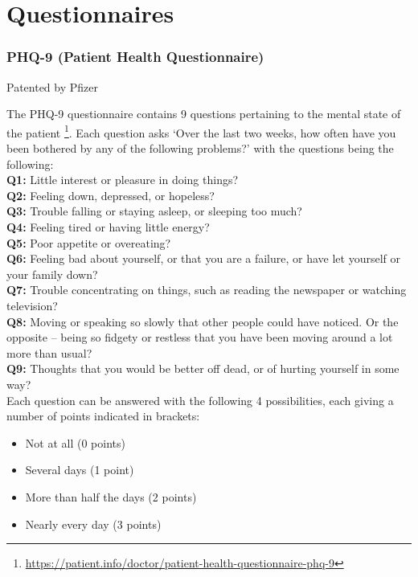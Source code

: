 \chapter{Questionnaires}
\label{appendix:questionnaires}
\subsection{PHQ-9 (Patient Health Questionnaire)}
Patented by Pfizer

The PHQ-9 questionnaire contains 9 questions pertaining to the mental state of the patient \footnote{\url{https://patient.info/doctor/patient-health-questionnaire-phq-9}}. Each question asks ‘Over the last two weeks, how often have you been bothered by any of the following problems?’ with the questions being the following: \\

\textbf{Q1:} Little interest or pleasure in doing things? \\

\textbf{Q2:} Feeling down, depressed, or hopeless? \\

\textbf{Q3:} Trouble falling or staying asleep, or sleeping too much? \\

\textbf{Q4:} Feeling tired or having little energy? \\

\textbf{Q5:} Poor appetite or overeating? \\

\textbf{Q6:} Feeling bad about yourself, or that you are a failure, or have let yourself or your family down? \\

\textbf{Q7:} Trouble concentrating on things, such as reading the newspaper or watching television? \\

\textbf{Q8:} Moving or speaking so slowly that other people could have noticed. Or the opposite – being so fidgety or restless that you have been moving around a lot more than usual? \\

\textbf{Q9:} Thoughts that you would be better off dead, or of hurting yourself in some way? \\

Each question can be answered with the following 4 possibilities, each giving a number of points indicated in brackets:

\begin{itemize}
\item Not at all (0 points)
\item Several days (1 point)
\item More than half the days (2 points)
\item Nearly every day (3 points)
\end{itemize}

